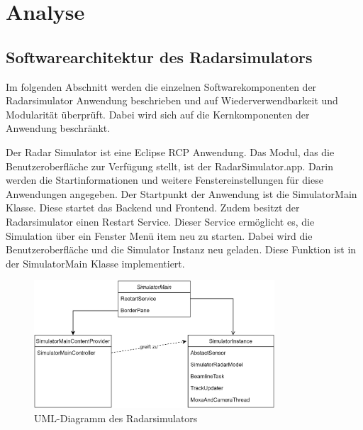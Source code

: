 \chapter{Analyse}

\section{Softwarearchitektur des Radarsimulators}
Im folgenden Abschnitt werden die einzelnen Softwarekomponenten der Radarsimulator Anwendung beschrieben und auf Wiederverwendbarkeit und Modularität überprüft. Dabei wird sich auf die Kernkomponenten der Anwendung beschränkt.

Der Radar Simulator ist eine Eclipse RCP Anwendung. Das Modul, das die Benutzeroberfläche zur Verfügung stellt, ist der RadarSimulator.app. Darin werden die Startinformationen und weitere Fenstereinstellungen für diese Anwendungen angegeben. Der Startpunkt der Anwendung ist die SimulatorMain Klasse. Diese startet das Backend und Frontend. Zudem besitzt der Radarsimulator einen Restart Service. Dieser Service ermöglicht es, die Simulation über ein Fenster Menü item neu zu starten. Dabei wird die Benutzeroberfläche und die Simulator Instanz neu geladen. Diese Funktion ist in der SimulatorMain Klasse implementiert.

\begin{figure}[h]
    \centering
    \includegraphics[width=0.8\textwidth]{content/assets/RadarSimulatorUML.png}
    \caption{UML-Diagramm des Radarsimulators}
\end{figure}